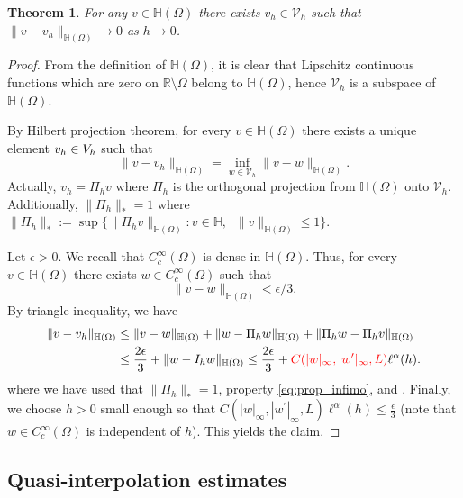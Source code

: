 \documentclass[10 pt]{article}
\newtheorem{theorem}{Theorem}[section]
\numberwithin{equation}{section}
\def\R{\mathbb{R}}
\newcommand{\B}[1]{{\color{red} #1}}  %
\begin{document}
\begin{theorem}\label{density:thm}
    For any $v\in\mathbb H(\Omega)$ there exists $v_h\in\mathcal V_h$ such that $\|v-v_h\|_{\mathbb H(\Omega)}\to 0$ as $h\to 0$. 
\end{theorem}

\begin{proof}
%
From the definition of $\mathbb H(\Omega)$, it is clear that Lipschitz continuous functions which are zero on $\R\setminus \Omega$ belong to $\mathbb H(\Omega)$, hence $\mathcal V_h$ is a subspace of $\mathbb H(\Omega)$.

By Hilbert projection theorem, for every $v\in\mathbb H(\Omega)$ there exists a unique element $v_h\in\mathcal \mathcal V_h$ such that
%
\begin{equation}\label{eq:prop_infimo}
    \|v-v_h\|_{\mathbb H(\Omega)}=\inf_{w\in\mathcal V_h}\|v-w\|_{\mathbb H(\Omega)}. 
\end{equation}
%
Actually, $v_h=\Pi_h v$ where $\Pi_h$ is the orthogonal projection from $\mathbb H(\Omega)$ onto $\mathcal V_h$. Additionally, $\|\Pi_h\|_*=1$ where $\|\Pi_h\|_*:=\sup\{\|\Pi_hv\|_{\mathbb H(\Omega)}: v\in\mathbb{H},\;\; \|v\|_{\mathbb H(\Omega)}\leq 1\}$.

Let $\epsilon>0$. We recall that $C_c^\infty(\Omega)$ is dense in $\mathbb H(\Omega)$. Thus, for every $v\in\mathbb H(\Omega)$ there exists $w\in C_c^\infty(\Omega)$ such that 
%
\begin{equation*}%
    \|v-w\|_{\mathbb H(\Omega)}<\epsilon/3.
\end{equation*}
%
By triangle inequality, we have
%
\begin{align*}
    \|v-v_h\|_{\mathbb H(\Omega)}&\leq \|v-w\|_{\mathbb H(\Omega)}+\|w-\Pi_h w\|_{\mathbb H(\Omega)}+\|\Pi_h w-\Pi_h v\|_{\mathbb H(\Omega)} \\
    &\leq \frac{2\epsilon}{3}+\|w-I_hw\|_{\mathbb H(\Omega)} \leq \frac{2\epsilon}{3}+\B{C(|w|_{\infty},|w^\prime|_{\infty},L)}\ell^\alpha(h). 
\end{align*}
%
where we have used that $\|\Pi_h\|_*=1$, property \eqref{eq:prop_infimo}, and . \B{Finally, we choose $h>0$ small enough so that ${C(|w|_{\infty},|w^\prime|_{\infty},L)}\ell^\alpha(h)\leq \frac{\epsilon}{3}$ (note that $w\in C^\infty_c(\Omega)$ is independent of $h$)}. This yields the claim.
\end{proof}


\subsection{Quasi-interpolation estimates}\label{sec:estimates}
\end{document}
